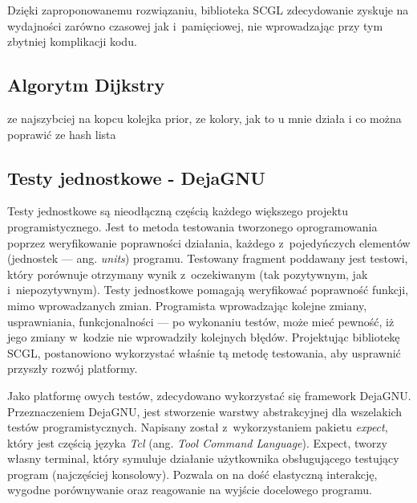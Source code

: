 \documentclass[a4paper,12pt,polish,oneside]{thesis}
\begin{document}
Dzięki zaproponowanemu rozwiązaniu, biblioteka SCGL zdecydowanie zyskuje na wydajności zarówno czasowej jak i~pamięciowej, nie wprowadzając przy tym zbytniej komplikacji kodu.

\subsection{Algorytm Dijkstry}
ze najszybciej na kopcu kolejka prior, ze kolory, jak to u mnie działa i co można poprawić ze hash lista
\subsection{Testy jednostkowe - DejaGNU}
Testy jednostkowe są nieodłączną częścią każdego większego projektu programistycznego.
Jest to metoda testowania tworzonego oprogramowania poprzez weryfikowanie poprawności działania, każdego z~pojedyńczych elementów (jednostek --- ang. \emph{units}) programu.
Testowany fragment poddawany jest testowi, który porównuje otrzymany wynik z~oczekiwanym (tak pozytywnym, jak i~niepozytywnym).
Testy jednostkowe pomagają weryfikować poprawność funkcji, mimo wprowadzanych zmian.
Programista wprowadzając kolejne zmiany, usprawniania, funkcjonalności --- po wykonaniu testów, może mieć pewność, iż jego zmiany w~kodzie nie wprowadziły kolejnych błędów.
Projektując bibliotekę SCGL, postanowiono wykorzystać właśnie tą metodę testowania, aby usprawnić przyszły rozwój platformy.

Jako platformę owych testów, zdecydowano wykorzystać się framework DejaGNU.
Przeznaczeniem DejaGNU, jest stworzenie warstwy abstrakcyjnej dla wszelakich testów programistycznych.
Napisany został z~wykorzystaniem pakietu \emph{expect}, który jest częścią języka \emph{Tcl} (ang. \emph{Tool Command Language}).
Expect, tworzy własny terminal, który symuluje działanie użytkownika obsługującego testujący program (najczęściej konsolowy).
Pozwala on na dość elastyczną interakcję, wygodne porównywanie oraz reagowanie na wyjście docelowego programu.
\end{document}
